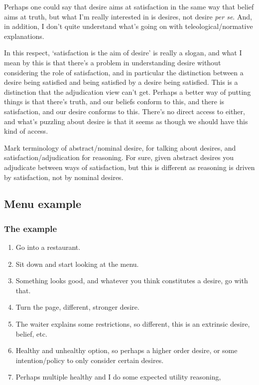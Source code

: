 \documentclass[10pt]{article}
\begin{document}
Perhaps one could say that desire aims at satisfaction in the same way that belief aims at truth, but what I'm really interested in is desires, not desire \emph{per se}.
And, in addition, I don't quite understand what's going on with teleological/normative explanations.

In this respect, `satisfaction is the aim of desire' is really a slogan, and what I mean by this is that there's a problem in understanding desire without considering the role of satisfaction, and in particular the distinction between a desire being satisfied and being satisfied by a desire being satisfied.
This is a distinction that the adjudication view can't get.
Perhaps a better way of putting things is that there's truth, and our beliefs conform to this, and there is satisfaction, and our desire conforms to this.
There's no direct access to either, and what's puzzling about desire is that it seems as though we should have this kind of access.

Mark terminology of abstract/nominal desire, for talking about desires, and satisfaction/adjudication for reasoning.
For sure, given abstract desires you adjudicate between ways of satisfaction, but this is different as reasoning is driven by satisfaction, not by nominal desires.

\subsection{Menu example}
\label{sec:menu-example}

\subsubsection{The example}
\label{sec:example}

\begin{enumerate}
\item Go into a restaurant.
\item Sit down and start looking at the menu.
\item Something looks good, and whatever you think constitutes a desire, go with that.
\item Turn the page, different, stronger desire.
\item The waiter explains some restrictions, so different, this is an extrinsic desire, belief, etc.
\item Healthy and unhealthy option, so perhaps a higher order desire, or some intention/policy to only consider certain desires.
\item Perhaps multiple healthy and I do some expected utility reasoning,
\end{enumerate}
\end{document}
